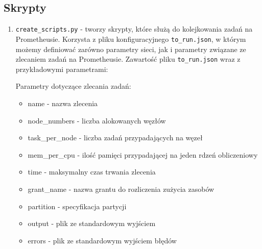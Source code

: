 \subsection{Skrypty}
\begin{enumerate}
	\item {\texttt{create\_scripts.py} } - 
	tworzy skrypty, które służą do kolejkowania zadań na Prometheusie. Korzysta z pliku konfiguracyjnego \texttt{to\_run.json},
	w którym możemy definiować zarówno parametry sieci, jak i parametry związane ze zlecaniem zadań na Prometheusie.
	Zawartość pliku \texttt{to\_run.json} wraz z przykładowymi parametrami:
	
	\begin{import}
		[
		  {
		    "beginning": "#!/bin/sh",
		    "name": "#SBATCH -J test",
		    "node_numbers": "#SBATCH -N 1",
		    "tasks_per_node": "#SBATCH --ntasks-per-node=1",
		    "mem_per_cpu": "#SBATCH --mem-per-cpu=5GB",
		    "time": "#SBATCH --time=00:20:00",
		    "grant_name": "#SBATCH -A ap2018",
		    "partition": "#SBATCH -p plgrid",
		    "output": "#SBATCH --output=",
		    "errors": "#SBATCH --error=",
		    "hidden_size": "100",
		    "num_layers": "2",
		    "num_epochs": "5",
		    "batch_size": "40",
		    "timesteps": "50",
		    "learning_rate": "0.004",
		    "authors_size": "100",
		    "vocab_size": "48",
		    "save_path": "../results/",
		    "learning_tensors_path": "../data/dutch/tensors/known/",
		    "testing_tensors_path": "../data/dutch/tensors/known/",
		    "language": "DU"
		  }
		]
	\end{import}
	
	Parametry dotyczące zlecania zadań:
	\begin{itemize}
	  \item name - nazwa zlecenia
	  \item node\_numbers - liczba alokowanych węzłów
	  \item task\_per\_node - liczba zadań przypadających na węzeł
	  \item mem\_per\_cpu - ilość pamięci przypadającej na jeden rdzeń obliczeniowy
	  \item time - maksymalny czas trwania zlecenia
	  \item grant\_name - nazwa grantu do rozliczenia zużycia zasobów
	  \item partition - specyfikacja partycji
	  \item output - plik ze standardowym wyjściem
	  \item errors - plik ze standardowym wyjściem błędów
	\end{itemize}
	

\end{enumerate}
